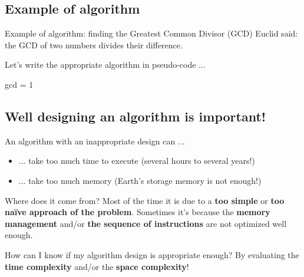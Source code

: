 \documentclass{beamer}[10pt, usepdftitle=false, handout]
\begin{document}
	\subsection{Example of algorithm}

	\begin{frame}    
       
    \begin{block}{Example of algorithm: finding the Greatest Common Divisor (GCD)}
	Euclid said: the GCD of two numbers divides their difference. 
	\end{block}	
    
	Let's write the appropriate algorithm in pseudo-code ...    
    
	
	\pause    
	\begin{center}    
    \scalebox{0.75} {
    \begin{algorithm}[H]
	gcd = 1\; 	
 	\caption{Euclid's algorithm in pseudo-code}
	\end{algorithm}	
	}
	\end{center}    
    

    \end{frame}

	\subsection{Well designing an algorithm is important!}

	\begin{frame}
	
	An algorithm  with an inappropriate design can ...
	\begin{itemize}
	\item {... take too much time to execute (several hours to several years!)}	
	\item {... take too much memory (Earth's storage memory is not enough!)}
	\end{itemize}
	
	\pause	
	
	\begin{alertblock}{Where does it come from?}
	Most of the time it is due to a \textbf{too simple} or \textbf{too naïve approach of the problem}. Sometimes it's because the \textbf{memory management} and/or \textbf{the sequence of instructions} are not optimized well enough. 
	\end{alertblock}
	
	\pause	
	
	\begin{block}{How can I know if my algorithm design is appropriate enough?}
	By evaluating the \textbf{time complexity} and/or the \textbf{space complexity}!
	\end{block}	
	
	\end{frame}	
	
\end{document}
